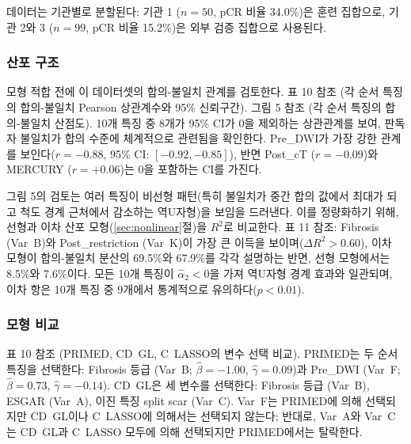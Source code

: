 \documentclass[a4paper,11pt]{article}
\begin{document}
데이터는 기관별로 분할된다: 기관 1 ($n = 50$, pCR 비율 34.0\%)은 훈련 집합으로, 기관 2와 3 ($n = 99$, pCR 비율 15.2\%)은 외부 검증 집합으로 사용된다.

\subsubsection{산포 구조}

모형 적합 전에 이 데이터셋의 합의-불일치 관계를 검토한다.
표 10 참조 (각 순서 특징의 합의-불일치 Pearson 상관계수와 95\% 신뢰구간).
그림 5 참조 (각 순서 특징의 합의-불일치 산점도).
10개 특징 중 8개가 95\% CI가 0을 제외하는 상관관계를 보여, 판독자 불일치가 합의 수준에 체계적으로 관련됨을 확인한다.
Pre\_DWI가 가장 강한 관계를 보인다($r = -0.88$, 95\% CI: $[-0.92, -0.85]$), 반면 Post\_cT ($r = -0.09$)와 MERCURY ($r = +0.06$)는 0을 포함하는 CI를 가진다.

그림 5의 검토는 여러 특징이 비선형 패턴(특히 불일치가 중간 합의 값에서 최대가 되고 척도 경계 근처에서 감소하는 역U자형)을 보임을 드러낸다.
이를 정량화하기 위해, 선형과 이차 산포 모형(\ref{sec:nonlinear}절)을 $R^2$로 비교한다.
표 11 참조: Fibrosis (Var~B)와 Post\_restriction (Var~K)이 가장 큰 이득을 보이며($\Delta R^2 > 0.60$), 이차 모형이 합의-불일치 분산의 69.5\%와 67.9\%를 각각 설명하는 반면, 선형 모형에서는 8.5\%와 7.6\%이다.
모든 10개 특징이 $\hat\alpha_2 < 0$을 가져 역U자형 경계 효과와 일관되며, 이차 항은 10개 특징 중 9개에서 통계적으로 유의하다($p < 0.01$).

\subsubsection{모형 비교}

표 10 참조 (PRIMED, CD~GL, C~LASSO의 변수 선택 비교).
PRIMED는 두 순서 특징을 선택한다: Fibrosis 등급 (Var~B; $\hat\beta = -1.00$, $\hat\gamma = 0.09$)과 Pre\_DWI (Var~F; $\hat\beta = 0.73$, $\hat\gamma = -0.14$).
CD~GL은 세 변수를 선택한다: Fibrosis 등급 (Var~B), ESGAR (Var~A), 이진 특징 split scar (Var~C).
Var~F는 PRIMED에 의해 선택되지만 CD~GL이나 C~LASSO에 의해서는 선택되지 않는다; 반대로, Var~A와 Var~C는 CD~GL과 C~LASSO 모두에 의해 선택되지만 PRIMED에서는 탈락한다.
\end{document}
